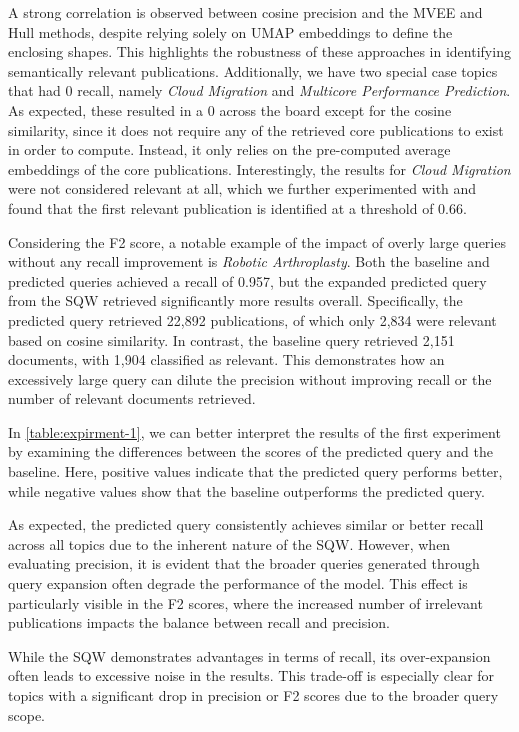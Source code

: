 A strong correlation is observed between cosine precision and the MVEE and Hull methods, despite relying solely on UMAP embeddings to define the enclosing shapes. This highlights the robustness of these approaches in identifying semantically relevant publications. Additionally, we have two special case topics that had 0 recall, namely \textit{Cloud Migration} and \textit{Multicore Performance Prediction}. As expected, these resulted in a 0 across the board except for the cosine similarity, since it does not require any of the retrieved core publications to exist in order to compute. Instead, it only relies on the pre-computed average embeddings of the core publications. Interestingly, the results for \textit{Cloud Migration} were not considered relevant at all, which we further experimented with and found that the first relevant publication is identified at a threshold of 0.66.


Considering the F2 score, a notable example of the impact of overly large queries without any recall improvement is \textit{Robotic Arthroplasty}. Both the baseline and predicted queries achieved a recall of 0.957, but the expanded predicted query from the SQW retrieved significantly more results overall. Specifically, the predicted query retrieved 22,892 publications, of which only 2,834 were relevant based on cosine similarity. In contrast, the baseline query retrieved 2,151 documents, with 1,904 classified as relevant. This demonstrates how an excessively large query can dilute the precision without improving recall or the number of relevant documents retrieved.

In \autoref{table:expirment-1}, we can better interpret the results of the first experiment by examining the differences between the scores of the predicted query and the baseline. Here, positive values indicate that the predicted query performs better, while negative values show that the baseline outperforms the predicted query. 

As expected, the predicted query consistently achieves similar or better recall across all topics due to the inherent nature of the SQW. However, when evaluating precision, it is evident that the broader queries generated through query expansion often degrade the performance of the model. This effect is particularly visible in the F2 scores, where the increased number of irrelevant publications impacts the balance between recall and precision.

While the SQW demonstrates advantages in terms of recall, its over-expansion often leads to excessive noise in the results. This trade-off is especially clear for topics with a significant drop in precision or F2 scores due to the broader query scope.


